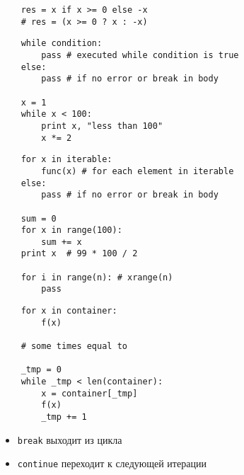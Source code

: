\documentclass{article}
\begin{document}
\vspace{15pt}
\begin{lstlisting}
    res = x if x >= 0 else -x
    # res = (x >= 0 ? x : -x)
\end{lstlisting}
\newpage

\vspace{15pt}
\begin{lstlisting}
    while condition:
        pass # executed while condition is true
    else:
        pass # if no error or break in body

    x = 1
    while x < 100:
        print x, "less than 100"
        x *= 2
\end{lstlisting}
\newpage

\vspace{15pt}
\begin{lstlisting}
    for x in iterable:
        func(x) # for each element in iterable
    else:
        pass # if no error or break in body

    sum = 0
    for x in range(100):
        sum += x
    print x  # 99 * 100 / 2

    for i in range(n): # xrange(n)
        pass

\end{lstlisting}
\newpage

\vspace{15pt}
\begin{lstlisting}
    for x in container:
        f(x)

    # some times equal to

    _tmp = 0
    while _tmp < len(container):
        x = container[_tmp]
        f(x)
        _tmp += 1
\end{lstlisting}
\newpage

\begin{itemize}
    \item \lstinline!break!  выходит из цикла
    \item \lstinline!continue! переходит к следующей итерации
\end{itemize}
\newpage
\end{document}
